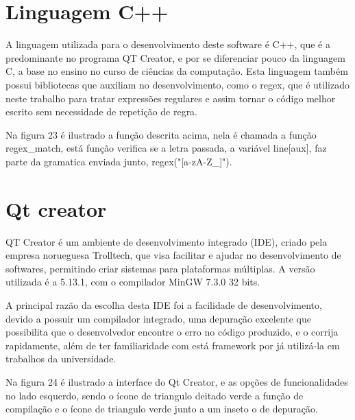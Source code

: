 \documentclass[12pt,oneside,a4paper,chapter=TITLE,section=TITLE,sumario=tradicional]{abntex2}
\begin{document}
\section{Linguagem C++}
\label{sec:linugagemc++}

A linguagem utilizada para o desenvolvimento deste software é C++, que é a predominante no programa QT Creator, e por se diferenciar pouco da linguagem C, a base no ensino no curso de ciências da computação. Esta linguagem também possui bibliotecas que auxiliam no desenvolvimento, como o regex, que é utilizado neste trabalho para tratar expressões regulares e assim tornar o código melhor escrito sem necessidade de repetição de regra.

Na figura 23 é ilustrado a função descrita acima, nela é chamada a função regex\_match, está função verifica se a letra passada, a variável line[aux], faz parte da gramatica enviada junto, regex("[a-zA-Z\_]").

\begin{figure}[htb]
\end{figure} 

\section{Qt creator}
\label{sec:qtcreator}

QT Creator é um ambiente de desenvolvimento integrado (IDE), criado pela empresa norueguesa Trolltech, que visa facilitar e ajudar no desenvolvimento de softwares, permitindo criar sistemas para plataformas múltiplas. A versão utilizada é a 5.13.1, com o compilador MinGW 7.3.0 32 bits. 

A principal razão da escolha desta IDE foi a facilidade de desenvolvimento, devido a possuir um compilador integrado, uma depuração excelente que possibilita que o desenvolvedor encontre o erro no código produzido, e o corrija rapidamente, além de ter familiaridade com está framework por já utilizá-la em trabalhos da universidade. 

Na figura 24 é ilustrado a interface do Qt Creator, e as opções de funcionalidades no lado esquerdo, sendo o ícone de triangulo deitado verde a função de compilação e o ícone de triangulo verde junto a um inseto o de depuração.

\begin{figure}[htb]
\end{figure} 
\end{document}
